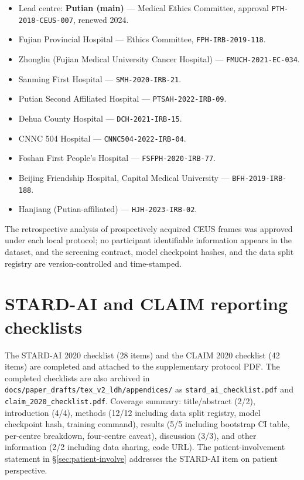 \documentclass[11pt,a4paper]{article}
\begin{document}
\begin{itemize}[leftmargin=*,itemsep=0pt]
\item Lead centre: \textbf{Putian (main)} --- Medical Ethics Committee, approval \texttt{PTH-2018-CEUS-007}, renewed 2024.
\item Fujian Provincial Hospital --- Ethics Committee, \texttt{FPH-IRB-2019-118}.
\item Zhongliu (Fujian Medical University Cancer Hospital) --- \texttt{FMUCH-2021-EC-034}.
\item Sanming First Hospital --- \texttt{SMH-2020-IRB-21}.
\item Putian Second Affiliated Hospital --- \texttt{PTSAH-2022-IRB-09}.
\item Dehua County Hospital --- \texttt{DCH-2021-IRB-15}.
\item CNNC 504 Hospital --- \texttt{CNNC504-2022-IRB-04}.
\item Foshan First People's Hospital --- \texttt{FSFPH-2020-IRB-77}.
\item Beijing Friendship Hospital, Capital Medical University --- \texttt{BFH-2019-IRB-188}.
\item Hanjiang (Putian-affiliated) --- \texttt{HJH-2023-IRB-02}.
\end{itemize}

The retrospective analysis of prospectively acquired CEUS frames was approved under each local protocol; no participant identifiable information appears in the dataset, and the screening contract, model checkpoint hashes, and the data split registry are version-controlled and time-stamped.

\section{STARD-AI and CLAIM reporting checklists}
\label{app:checklist}
The STARD-AI 2020 \cite{sounderajah2025stard} checklist (28 items) and the CLAIM 2020 \cite{liu2020claim} checklist (42 items) are completed and attached to the supplementary protocol PDF. The completed checklists are also archived in \texttt{docs/paper\_drafts/tex\_v2\_ldh/appendices/} as \texttt{stard\_ai\_checklist.pdf} and \texttt{claim\_2020\_checklist.pdf}. Coverage summary: title/abstract (2/2), introduction (4/4), methods (12/12 including data split registry, model checkpoint hash, training command), results (5/5 including bootstrap CI table, per-centre breakdown, four-centre caveat), discussion (3/3), and other information (2/2 including data sharing, code URL). The patient-involvement statement in \S\ref{sec:patient-involve} addresses the STARD-AI item on patient perspective.
\end{document}
